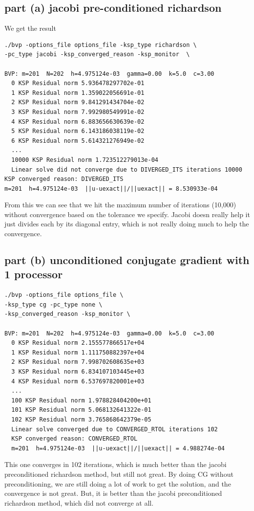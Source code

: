 \documentclass[12pt]{article}
\begin{document}
\subsection{part (a) jacobi pre-conditioned richardson}
We get the result
\begin{verbatim}
./bvp -options_file options_file -ksp_type richardson \ 
-pc_type jacobi -ksp_converged_reason -ksp_monitor  \ 

BVP: m=201  N=202  h=4.975124e-03  gamma=0.00  k=5.0  c=3.00
  0 KSP Residual norm 5.936478297702e-01
  1 KSP Residual norm 1.359022056691e-01
  2 KSP Residual norm 9.841291434704e-02
  3 KSP Residual norm 7.992980549991e-02
  4 KSP Residual norm 6.883656630639e-02
  5 KSP Residual norm 6.143186038119e-02
  6 KSP Residual norm 5.614321276949e-02
  ...
  10000 KSP Residual norm 1.723512279013e-04
  Linear solve did not converge due to DIVERGED_ITS iterations 10000
KSP converged reason: DIVERGED_ITS
m=201  h=4.975124e-03  ||u-uexact||/||uexact|| = 8.530933e-04
\end{verbatim}

From this we can see that we hit the maximum number of iterations (10,000) without convergence based on the tolerance we specify. Jacobi doesn really help it just divides each by its diagonal entry, which is not really doing much to help the convergence. 


\subsection{part (b) unconditioned conjugate gradient with 1 processor}
\begin{verbatim}
./bvp -options_file options_file \
-ksp_type cg -pc_type none \
-ksp_converged_reason -ksp_monitor \

BVP: m=201  N=202  h=4.975124e-03  gamma=0.00  k=5.0  c=3.00
  0 KSP Residual norm 2.155577866517e+04
  1 KSP Residual norm 1.111750882397e+04
  2 KSP Residual norm 7.998702608635e+03
  3 KSP Residual norm 6.834107103445e+03
  4 KSP Residual norm 6.537697820001e+03
  ...
  100 KSP Residual norm 1.978828404200e+01
  101 KSP Residual norm 5.068132641322e-01
  102 KSP Residual norm 3.765868642379e-05
  Linear solve converged due to CONVERGED_RTOL iterations 102
  KSP converged reason: CONVERGED_RTOL
  m=201  h=4.975124e-03  ||u-uexact||/||uexact|| = 4.988274e-04
\end{verbatim}

This one converges in 102 iterations, which is much better than the jacobi preconditioned richardson method, but still not great. By doing CG without preconditioning, we are still doing a lot of work to get the solution, and the convergence is not great. But, it is better than the jacobi preconditioned richardson method, which did not converge at all.
\end{document}
